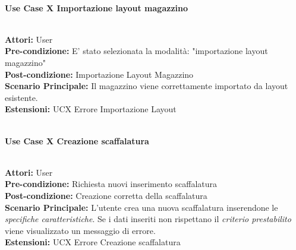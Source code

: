 \vspace{0.5cm}

\Large\textbf{}\\
\Large\textbf{Use Case X Importazione layout magazzino} \\
\vspace{0.5cm}

\large\textbf{} \\
\textbf{Attori:} User\\
\textbf{Pre-condizione:} E' stato selezionata la modalità: "importazione layout magazzino" \\
\textbf{Post-condizione: } Importazione Layout Magazzino\\
\textbf{Scenario Principale:}  Il magazzino viene correttamente importato da layout esistente.\\
\textbf{Estensioni: } UCX Errore Importazione Layout\\

\vspace{0.5cm}


\Large\textbf{}\\
\Large\textbf{Use Case X Creazione scaffalatura} \\
\vspace{0.5cm}

\large\textbf{} \\
\textbf{Attori:} User\\
\textbf{Pre-condizione:} Richiesta nuovi inserimento scaffalatura \\
\textbf{Post-condizione: } Creazione corretta della scaffalatura\\
\textbf{Scenario Principale:}  L'utente crea una nuova scaffalatura inserendone le \textit{specifiche caratteristiche}. Se i dati inseriti non rispettano il \textit{criterio prestabilito} viene visualizzato un messaggio di errore.\\
\textbf{Estensioni: } UCX Errore Creazione scaffalatura\\

\vspace{0.5cm}

\textbf{}\\
{} \\
{}\\

